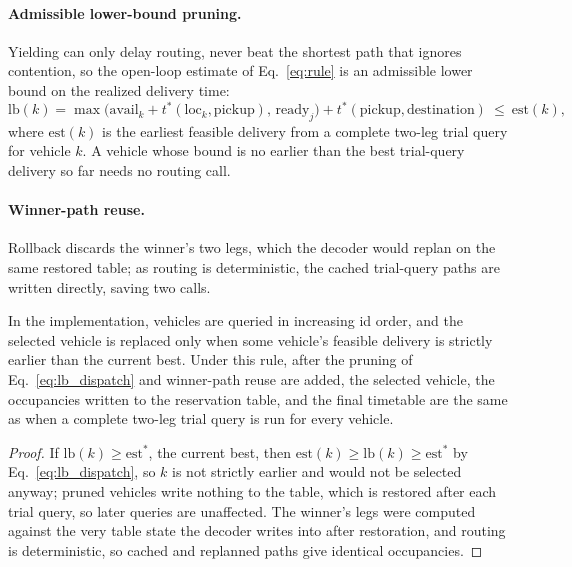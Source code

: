 \paragraph{Admissible lower-bound pruning.}
Yielding can only delay routing, never beat the shortest path that ignores contention, so the open-loop estimate of Eq.~\eqref{eq:rule} is an admissible lower bound on the realized delivery time:
\begin{equation}
\label{eq:lb_dispatch}
\mathrm{lb}(k)=\max\bigl(\mathrm{avail}_k+t^{*}(\mathrm{loc}_k,\text{pickup}),\,
\mathrm{ready}_j\bigr)+t^{*}(\text{pickup},\text{destination})\ \le\ \mathrm{est}(k),
\end{equation}
where $\mathrm{est}(k)$ is the earliest feasible delivery from a complete two-leg trial query for vehicle $k$.
A vehicle whose bound is no earlier than the best trial-query delivery so far needs no routing call.

\paragraph{Winner-path reuse.}
Rollback discards the winner's two legs, which the decoder would replan on the same restored table; as routing is deterministic, the cached trial-query paths are written directly, saving two calls.

\begin{prop}
  \label{prop:speedup_equiv}
  In the implementation, vehicles are queried in increasing id order, and the selected vehicle is replaced only when some vehicle's feasible delivery is strictly earlier than the current best.
  Under this rule, after the pruning of Eq.~\eqref{eq:lb_dispatch} and winner-path reuse are added, the selected vehicle, the occupancies written to the reservation table, and the final timetable are the same as when a complete two-leg trial query is run for every vehicle.
\end{prop}

\begin{proof}
If $\mathrm{lb}(k)\ge\mathrm{est}^{\ast}$, the current best, then $\mathrm{est}(k)\ge\mathrm{lb}(k)\ge\mathrm{est}^{\ast}$ by Eq.~\eqref{eq:lb_dispatch}, so $k$ is not strictly earlier and would not be selected anyway; pruned vehicles write nothing to the table, which is restored after each trial query, so later queries are unaffected.
The winner's legs were computed against the very table state the decoder writes into after restoration, and routing is deterministic, so cached and replanned paths give identical occupancies.
\end{proof}

